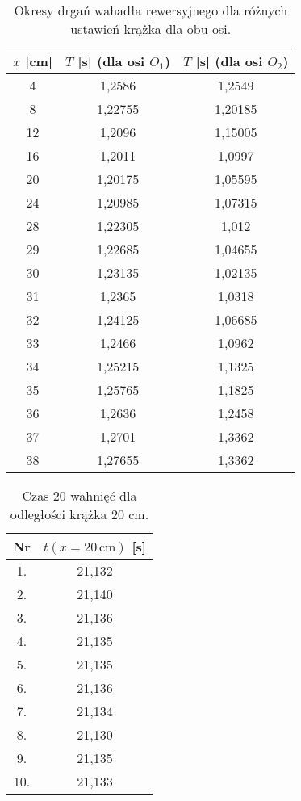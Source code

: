 \documentclass[a4paper,12pt]{article}
\begin{document}
\begin{table}[H]
  \centering
  \begin{tabular}{|c|c|c|}
    \toprule
    $x$ [cm] & $T$ [s] (dla osi $O_1$) & $T$ [s] (dla osi $O_2$) \\
    \midrule
    4  & 1,2586  & 1,2549  \\
    \hline
    8  & 1,22755 & 1,20185 \\
    \hline
    12 & 1,2096  & 1,15005 \\
    \hline
    16 & 1,2011  & 1,0997  \\
    \hline
    20 & 1,20175 & 1,05595 \\
    \hline
    24 & 1,20985 & 1,07315 \\
    \hline
    28 & 1,22305 & 1,012   \\
    \hline
    29 & 1,22685 & 1,04655 \\
    \hline
    30 & 1,23135 & 1,02135 \\
    \hline
    31 & 1,2365  & 1,0318  \\
    \hline
    32 & 1,24125 & 1,06685 \\
    \hline
    33 & 1,2466  & 1,0962  \\
    \hline
    34 & 1,25215 & 1,1325  \\
    \hline
    35 & 1,25765 & 1,1825  \\
    \hline
    36 & 1,2636  & 1,2458  \\
    \hline
    37 & 1,2701  & 1,3362  \\
    \hline
    38 & 1,27655 & 1,3362  \\
    \hline
  \end{tabular}
  \caption{Okresy drgań wahadła rewersyjnego dla różnych ustawień krążka dla obu osi.}
  \label{tab:okresy}
\end{table}

\begin{table}[H]
  \centering
  \begin{tabular}{|c|c|}
    \toprule
    Nr & $t(x=20\,\text{cm})$ [s] \\
    \midrule
    1.  & 21,132 \\
    \hline
    2.  & 21,140  \\
    \hline
    3. & 21,136 \\
    \hline
    4. & 21,135 \\
    \hline
    5. & 21,135 \\
    \hline
    6. & 21,136 \\
    \hline
    7. & 21,134 \\
    \hline
    8. & 21,130 \\
    \hline
    9. & 21,135 \\
    \hline
    10. & 21,133 \\
    \bottomrule
  \end{tabular}
  \caption{Czas 20 wahnięć dla odległości krążka 20 cm.}
  \label{tab:last_column}
\end{table}
\end{document}
